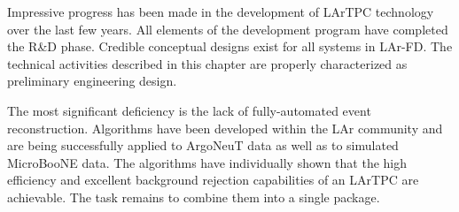 Impressive progress has been made in the development of LArTPC technology over the last few years. All elements of the development program have completed the R\&D phase. Credible conceptual designs exist for all systems in LAr-FD. The technical activities described in this chapter are properly characterized as preliminary engineering design.

The most significant deficiency is the lack of fully-automated event reconstruction. Algorithms have been developed within the LAr community and are being successfully applied to ArgoNeuT data as well as to simulated MicroBooNE data. The algorithms have individually shown that the high efficiency and excellent background rejection capabilities of an LArTPC are achievable. The task remains to combine them into a single package. 


